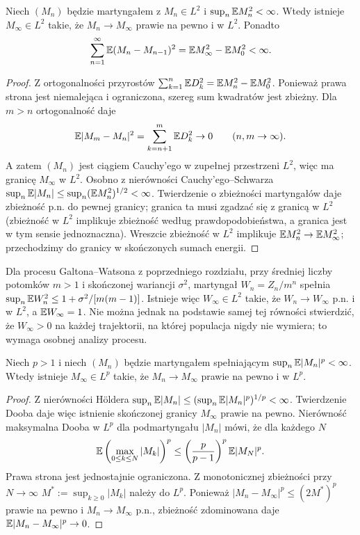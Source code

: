 \begin{twierdzenie}
Niech $(M_n)$ będzie martyngałem z $M_n\in L^2$
i $\sup_n\mathbb{E} M_n^2<\infty$. Wtedy istnieje
$M_\infty\in L^2$ takie, że
$M_n\to M_\infty$ prawie na pewno i w $L^2$.
Ponadto
\[
\sum_{n=1}^{\infty}\mathbb{E}(M_n-M_{n-1})^2
=\mathbb{E} M_\infty^2-\mathbb{E} M_0^2<\infty.
\]
\end{twierdzenie}
\begin{proof}
Z ortogonalności przyrostów
$\sum_{k=1}^n\mathbb{E} D_k^2
=\mathbb{E} M_n^2-\mathbb{E} M_0^2$.
Ponieważ prawa strona jest niemalejąca
i ograniczona, szereg sum kwadratów jest
zbieżny. Dla $m>n$ ortogonalność daje
\[
\mathbb{E}|M_m-M_n|^2=\sum_{k=n+1}^m\mathbb{E} D_k^2\to0
\qquad(n,m\to\infty).
\]
A zatem $(M_n)$ jest ciągiem Cauchy'ego
w zupełnej przestrzeni $L^2$, więc ma granicę
$M_\infty$ w $L^2$. Osobno z nierówności
Cauchy'ego--Schwarza
$\sup_n\mathbb{E}|M_n|\leq\sup_n(\mathbb{E} M_n^2)^{1/2}<\infty$.
Twierdzenie o zbieżności martyngałów daje
zbieżność p.n. do pewnej granicy; granica ta
musi zgadzać się z granicą w $L^2$
(zbieżność w $L^2$ implikuje zbieżność według
prawdopodobieństwa, a granica jest w tym sensie
jednoznaczna). Wreszcie zbieżność w $L^2$
implikuje $\mathbb{E} M_n^2\to\mathbb{E} M_\infty^2$;
przechodzimy do granicy w skończonych
sumach energii.
\end{proof}

\begin{przyklad}
Dla procesu Galtona--Watsona z poprzedniego rozdziału,
przy średniej liczby potomków $m>1$ i
skończonej wariancji $\sigma^2$, martyngał
$W_n=Z_n/m^n$ spełnia
$\sup_n\mathbb{E} W_n^2\leq1+\sigma^2/[m(m-1)]$.
Istnieje więc $W_\infty\in L^2$ takie, że
$W_n\to W_\infty$ p.n. i w $L^2$, a
$\mathbb{E} W_\infty=1$. Nie można jednak na podstawie
samej tej równości stwierdzić, że
$W_\infty>0$ na każdej trajektorii,
na której populacja nigdy nie wymiera;
to wymaga osobnej analizy procesu.
\end{przyklad}

\begin{twierdzenie}
Niech $p>1$ i niech $(M_n)$ będzie martyngałem
spełniającym $\sup_n\mathbb{E}|M_n|^p<\infty$.
Wtedy istnieje $M_\infty\in L^p$ takie, że
$M_n\to M_\infty$ prawie na pewno i w $L^p$.
\end{twierdzenie}
\begin{proof}
Z nierówności Höldera
$\sup_n\mathbb{E}|M_n|\leq(\sup_n\mathbb{E}|M_n|^p)^{1/p}<\infty$.
Twierdzenie Dooba daje więc istnienie skończonej
granicy $M_\infty$ prawie na pewno.
Nierówność maksymalna Dooba w $L^p$ dla
podmartyngału $|M_n|$ mówi, że dla każdego $N$
\[
\mathbb{E}\left(\max_{0\leq k\leq N}|M_k|\right)^p
\leq\left(\frac{p}{p-1}\right)^p\mathbb{E}|M_N|^p.
\]
Prawa strona jest jednostajnie ograniczona.
Z monotonicznej zbieżności przy $N\to\infty$
$M^*:=\sup_{k\geq0}|M_k|$ należy do $L^p$.
Ponieważ $|M_n-M_\infty|^p\leq (2M^*)^p$
prawie na pewno i $M_n\to M_\infty$ p.n.,
zbieżność zdominowana daje
$\mathbb{E}|M_n-M_\infty|^p\to0$.
\end{proof}

